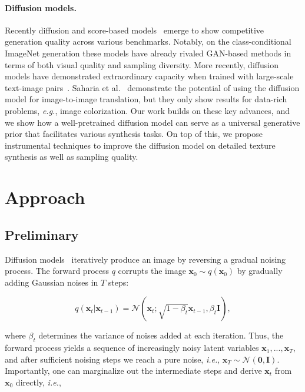 \paragraph{Diffusion models.} Recently diffusion and score-based models~\cite{sohl2015deep,ho2020denoising,song2020improved,dhariwal2021diffusion,ho2022cascaded} emerge to show competitive generation quality across various benchmarks. Notably, on the class-conditional ImageNet generation these models have already rivaled GAN-based methods in terms of both visual quality and sampling diversity. More recently, diffusion models have demonstrated extraordinary capacity when trained with large-scale text-image pairs~\cite{nichol2021glide,gu2021vector,ramesh2022hierarchical}. Saharia et al.~\cite{saharia2021palette} demonstrate the potential of using the diffusion model for image-to-image translation, but they only show results for data-rich problems, \textit{e.g.}\@, image colorization. Our work builds on these key advances, and we show how a well-pretrained diffusion model can serve as a universal generative prior that facilitates various synthesis tasks. On top of this, we propose instrumental techniques to improve the diffusion model on detailed texture synthesis as well as sampling quality.

\section{Approach}

\subsection{Preliminary}
Diffusion models~\cite{sohl2015deep,ho2020denoising} iteratively produce an image by reversing a gradual noising process. The forward process $q$ corrupts the image $\bm{x}_0 \sim q(\bm{x}_0)$ by  gradually adding Gaussian noises in $T$ steps:

\begin{equation}
  q\left(\bm{x}_{t} | \bm{x}_{t-1}\right)= \mathcal{N}\left(\bm{x}_{t} ; \sqrt{1-\beta_{t}} \bm{x}_{t-1}, \beta_{t} \bm{I}\right),
\end{equation}

where $\beta_t$ determines the variance of noises added at each iteration. Thus, the forward process yields a sequence of increasingly noisy latent variables $\bm{x}_1,..., \bm{x}_T$, and after sufficient noising steps we reach a pure noise, \textit{i.e.}\@, $\bm{x}_T \sim \mathcal{N}(\bm{0},\bm{I})$. Importantly, one can marginalize out the intermediate steps and derive $\bm{x}_t$ from $\bm{x}_0$ directly, \textit{i.e.}\@,

